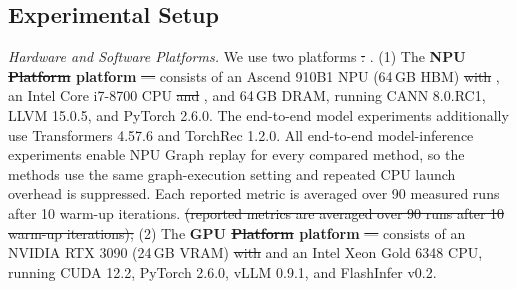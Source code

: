 \documentclass[manuscript,screen,review]{acmart}
\theoremstyle{indenteditalic}
\providecommand{\DIFaddtex}[1]{{\protect\color{blue}#1}} %
\providecommand{\DIFidentity}[1]{#1}
\providecommand{\DIFdeltex}[1]{{%
  \protect\color{red}%
  \normalfont\normalsize
  \let\textbf\DIFidentity
  \let\textit\DIFidentity
  \let\texttt\DIFidentity
  \let\textsc\DIFidentity
  \let\textsf\DIFidentity
  \let\emph\DIFidentity
  \let\uline\DIFidentity
  \sout{#1}%
}} %
\providecommand{\DIFaddbegin}{} %
\providecommand{\DIFaddend}{} %
\providecommand{\DIFdelbegin}{} %
\providecommand{\DIFdelend}{} %
\providecommand{\DIFadd}[1]{\texorpdfstring{\DIFaddtex{#1}}{#1}} %
\providecommand{\DIFdel}[1]{\texorpdfstring{\DIFdeltex{#1}}{}} %
\begin{document}
\subsection{Experimental Setup}
\label{sec:eval:setup}

\textit{Hardware and Software Platforms\DIFadd{.}}
We use two platforms\DIFdelbegin\DIFdel{:}\DIFdelend\DIFaddbegin\DIFadd{.}\DIFaddend{} (1) \DIFaddbegin\DIFadd{The }\DIFaddend\textbf{NPU \DIFdel{Platform}\DIFadd{platform}} \DIFdelbegin\DIFdel{—}\DIFdelend\DIFaddbegin\DIFadd{consists of an }\DIFaddend Ascend 910B1 NPU (64\DIFadd{\,}GB HBM)\DIFdel{ with}\DIFadd{, an} Intel Core i7-8700 CPU \DIFdel{and}\DIFadd{, and} 64\DIFadd{\,}GB DRAM, running CANN 8.0.RC1, LLVM 15.0.5, and PyTorch 2.6.0\DIFaddbegin \DIFadd{. The end-to-end model experiments additionally use Transformers 4.57.6 and TorchRec 1.2.0. All end-to-end model-inference experiments enable NPU Graph replay for every compared method, so the methods use the same graph-execution setting and repeated CPU launch overhead is suppressed. Each reported metric is averaged over 90 measured runs after 10 warm-up iterations. }\DIFaddend \DIFdelbegin\DIFdel{(reported metrics are averaged over 90 runs after 10 warm-up iterations);}\DIFdelend{} (2) \DIFaddbegin\DIFadd{The }\DIFaddend\textbf{GPU \DIFdel{Platform}\DIFadd{platform}} \DIFdelbegin\DIFdel{—}\DIFdelend\DIFaddbegin\DIFadd{consists of an }\DIFaddend NVIDIA RTX 3090 (24\DIFadd{\,}GB VRAM) \DIFdel{with}\DIFadd{and an} Intel Xeon Gold 6348 CPU, running CUDA 12.2, PyTorch 2.6.0, vLLM 0.9.1, and FlashInfer v0.2.
\end{document}
